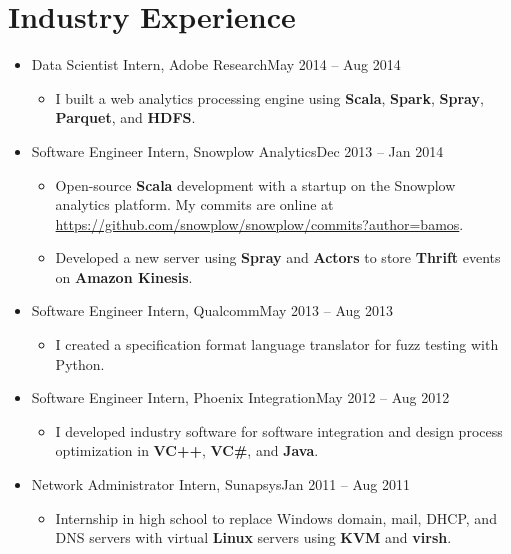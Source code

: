 \documentclass[11pt,letter,sans]{moderncv}
\begin{document}
\section{Industry Experience}
  \begin{itemize}
      \item Data Scientist Intern, Adobe Research\hfill May 2014 -- Aug 2014
      \begin{itemize}
            \item I built a web analytics processing engine using {\bf Scala}, {\bf Spark}, {\bf Spray}, {\bf Parquet}, and {\bf HDFS}. 
\end{itemize}
      \item Software Engineer Intern, Snowplow Analytics\hfill Dec 2013 -- Jan 2014
      \begin{itemize}
            \item Open-source {\bf Scala} development with a startup on the Snowplow analytics platform. My commits are online at \url{https://github.com/snowplow/snowplow/commits?author=bamos}. 
            \item Developed a new server using {\bf Spray} and {\bf Actors} to store {\bf Thrift} events on {\bf Amazon Kinesis}. 
\end{itemize}
      \item Software Engineer Intern, Qualcomm\hfill May 2013 -- Aug 2013
      \begin{itemize}
            \item I created a specification format language translator for fuzz testing with Python. 
\end{itemize}
      \item Software Engineer Intern, Phoenix Integration\hfill May 2012 -- Aug 2012
      \begin{itemize}
            \item I developed industry software for software integration and design process optimization in {\bf VC++}, {\bf VC\#}, and {\bf Java}. 
\end{itemize}
      \item Network Administrator Intern, Sunapsys\hfill Jan 2011 -- Aug 2011
      \begin{itemize}
            \item Internship in high school to replace Windows domain, mail, DHCP, and DNS servers with virtual {\bf Linux} servers using {\bf KVM} and {\bf virsh}. 
\end{itemize}
  \end{itemize}
\end{document}
